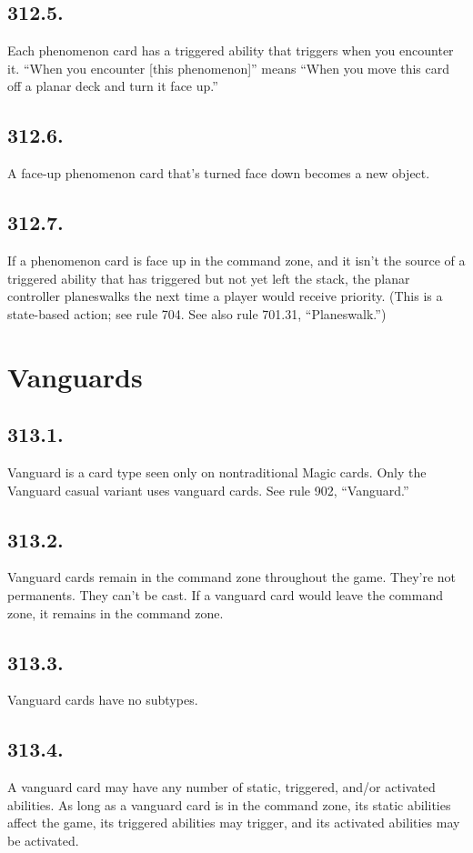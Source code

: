 \subsection*{312.5.}
Each phenomenon card has a triggered ability that triggers when you encounter it. “When you encounter [this phenomenon]” means “When you move this card off a planar deck and turn it face up.”

\subsection*{312.6.}
A face-up phenomenon card that’s turned face down becomes a new object.

\subsection*{312.7.}
If a phenomenon card is face up in the command zone, and it isn’t the source of a triggered ability that has triggered but not yet left the stack, the planar controller planeswalks the next time a player would receive priority. (This is a state-based action; see rule 704. See also rule 701.31, “Planeswalk.”)

\section{Vanguards}
\subsection*{313.1.}
Vanguard is a card type seen only on nontraditional Magic cards. Only the Vanguard casual variant uses vanguard cards. See rule 902, “Vanguard.”

\subsection*{313.2.}
Vanguard cards remain in the command zone throughout the game. They’re not permanents. They can’t be cast. If a vanguard card would leave the command zone, it remains in the command zone.

\subsection*{313.3.}
Vanguard cards have no subtypes.

\subsection*{313.4.}
A vanguard card may have any number of static, triggered, and/or activated abilities. As long as a vanguard card is in the command zone, its static abilities affect the game, its triggered abilities may trigger, and its activated abilities may be activated.

